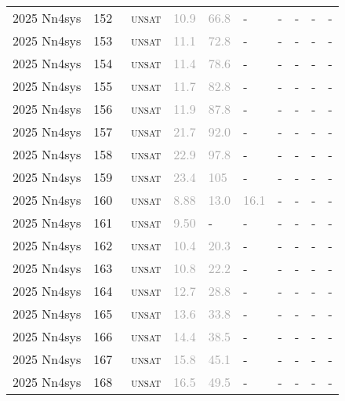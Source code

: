 \begin{center}
{\begin{longtable}{@{}llllllllll@{}}
2025 Nn4sys & 152 & ~\textsc{unsat} & \textcolor{darkgray}{10.9} & \textcolor{darkgray}{66.8} & - & - & - & - & - \\
2025 Nn4sys & 153 & ~\textsc{unsat} & \textcolor{darkgray}{11.1} & \textcolor{darkgray}{72.8} & - & - & - & - & - \\
2025 Nn4sys & 154 & ~\textsc{unsat} & \textcolor{darkgray}{11.4} & \textcolor{darkgray}{78.6} & - & - & - & - & - \\
2025 Nn4sys & 155 & ~\textsc{unsat} & \textcolor{darkgray}{11.7} & \textcolor{darkgray}{82.8} & - & - & - & - & - \\
2025 Nn4sys & 156 & ~\textsc{unsat} & \textcolor{darkgray}{11.9} & \textcolor{darkgray}{87.8} & - & - & - & - & - \\
2025 Nn4sys & 157 & ~\textsc{unsat} & \textcolor{darkgray}{21.7} & \textcolor{darkgray}{92.0} & - & - & - & - & - \\
2025 Nn4sys & 158 & ~\textsc{unsat} & \textcolor{darkgray}{22.9} & \textcolor{darkgray}{97.8} & - & - & - & - & - \\
2025 Nn4sys & 159 & ~\textsc{unsat} & \textcolor{darkgray}{23.4} & \textcolor{darkgray}{105} & - & - & - & - & - \\
2025 Nn4sys & 160 & ~\textsc{unsat} & \textcolor{darkgray}{8.88} & \textcolor{darkgray}{13.0} & \textcolor{darkgray}{16.1} & - & - & - & - \\
2025 Nn4sys & 161 & ~\textsc{unsat} & \textcolor{darkgray}{9.50} & - & - & - & - & - & - \\
2025 Nn4sys & 162 & ~\textsc{unsat} & \textcolor{darkgray}{10.4} & \textcolor{darkgray}{20.3} & - & - & - & - & - \\
2025 Nn4sys & 163 & ~\textsc{unsat} & \textcolor{darkgray}{10.8} & \textcolor{darkgray}{22.2} & - & - & - & - & - \\
2025 Nn4sys & 164 & ~\textsc{unsat} & \textcolor{darkgray}{12.7} & \textcolor{darkgray}{28.8} & - & - & - & - & - \\
2025 Nn4sys & 165 & ~\textsc{unsat} & \textcolor{darkgray}{13.6} & \textcolor{darkgray}{33.8} & - & - & - & - & - \\
2025 Nn4sys & 166 & ~\textsc{unsat} & \textcolor{darkgray}{14.4} & \textcolor{darkgray}{38.5} & - & - & - & - & - \\
2025 Nn4sys & 167 & ~\textsc{unsat} & \textcolor{darkgray}{15.8} & \textcolor{darkgray}{45.1} & - & - & - & - & - \\
2025 Nn4sys & 168 & ~\textsc{unsat} & \textcolor{darkgray}{16.5} & \textcolor{darkgray}{49.5} & - & - & - & - & - \\

\end{longtable}}
\end{center}
